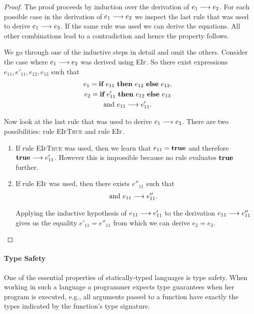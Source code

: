 {\begin{proof}
  The proof proceeds by induction over the derivation of ${e_1} \longrightarrow {e_2}$. For
  each possible case in the derivation of ${e_1} \longrightarrow {e_2}$ we 
  inspect the last rule that was used to derive ${e_1} \longrightarrow {e_3}$. If the same
  rule was used we can derive the equations. All other combinations lead to a
  contradiction and hence the property follows.

  We go through one of the inductive steps in detail and omit the
  others. Consider the case where ${e_1} \longrightarrow {e_2}$ was derived using
  \textsc{EIf}. So there exist expressions $e_{11}, e'_{11}, e_{12}, e_{13}$
  such that
  \begin{gather*}
    e_1 = \textbf{if}~{e_{11}}~\textbf{then}~{e_{12}}~\textbf{else}~{e_{13}}, \\
    e_2 = \textbf{if}~{e'_{11}}~\textbf{then}~{e_{12}}~\textbf{else}~{e_{13}} \\
    \text{and}~{e_{11}} \longrightarrow {e'_{11}}.
  \end{gather*}

  Now look at the last rule that was used to derive ${e_1} \longrightarrow {e_3}$. There are
  two possibilities: rule \textsc{EIfTrue} and rule \textsc{EIf}.

  \begin{enumerate}
  \item If rule \textsc{EIfTrue} was used, then we learn that $e_{11} = \textbf{true}$
    and therefore ${\textbf{true}} \longrightarrow {e'_{11}}$. However this is impossible because no
    rule evaluates $\textbf{true}$ further.

  \item If rule \textsc{EIf} was used, then there exists $e''_{11}$ such that
    \begin{gather*}
      \text{and}~{e_{11}} \longrightarrow {e''_{11}}.
    \end{gather*}

    Applying the inductive hypothesis of ${e_{11}} \longrightarrow {e'_{11}}$ to the
    derivation ${e_{11}} \longrightarrow {e''_{11}}$ gives us the equality
    $e'_{11} = e''_{11}$ from which we can derive $e_2 = e_3$.
  \end{enumerate}
\end{proof}



\paragraph{Type Safety}

One of the essential properties of statically-typed languages is type safety.
When working in such a language a programmer expects type guarantees when her
program is executed, e.g., all arguments passed to a function have exactly
the types indicated by the function's type signature.

}
